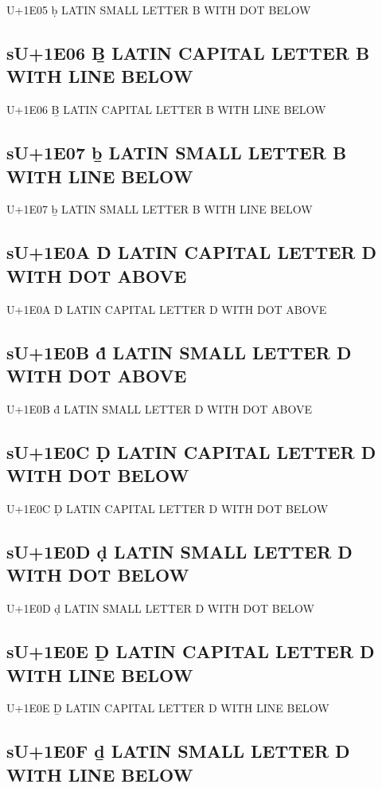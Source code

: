 U+1E05 ḅ LATIN SMALL LETTER B WITH DOT BELOW

\subsection{sU+1E06 Ḇ LATIN CAPITAL LETTER B WITH LINE BELOW}

U+1E06 Ḇ LATIN CAPITAL LETTER B WITH LINE BELOW

\subsection{sU+1E07 ḇ LATIN SMALL LETTER B WITH LINE BELOW}

U+1E07 ḇ LATIN SMALL LETTER B WITH LINE BELOW

\subsection{sU+1E0A Ḋ LATIN CAPITAL LETTER D WITH DOT ABOVE}

U+1E0A Ḋ LATIN CAPITAL LETTER D WITH DOT ABOVE

\subsection{sU+1E0B ḋ LATIN SMALL LETTER D WITH DOT ABOVE}

U+1E0B ḋ LATIN SMALL LETTER D WITH DOT ABOVE

\subsection{sU+1E0C Ḍ LATIN CAPITAL LETTER D WITH DOT BELOW}

U+1E0C Ḍ LATIN CAPITAL LETTER D WITH DOT BELOW

\subsection{sU+1E0D ḍ LATIN SMALL LETTER D WITH DOT BELOW}

U+1E0D ḍ LATIN SMALL LETTER D WITH DOT BELOW

\subsection{sU+1E0E Ḏ LATIN CAPITAL LETTER D WITH LINE BELOW}

U+1E0E Ḏ LATIN CAPITAL LETTER D WITH LINE BELOW

\subsection{sU+1E0F ḏ LATIN SMALL LETTER D WITH LINE BELOW}

